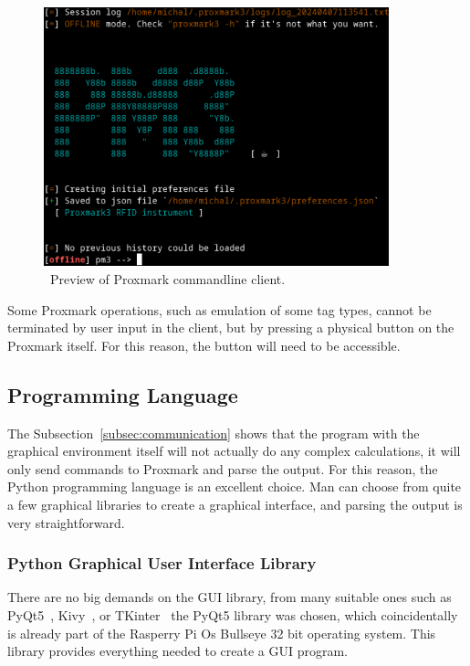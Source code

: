 \begin{figure}[ht]
  \centering
  \includegraphics[width=10cm]{text/pm3.png}
  \caption{~Preview of Proxmark commandline client.}
  \label{fig:pm3}
\end{figure}

Some Proxmark operations, such as emulation of some tag types, cannot be terminated by user input in the client, but by pressing a physical button on the Proxmark itself. For this reason, the button will need to be accessible.


\subsection{Programming Language}

The Subsection~\ref{subsec:communication} shows that the program with the graphical environment itself will not actually do any complex calculations, it will only send commands to Proxmark and parse the output. For this reason, the Python programming language is an excellent choice. Man can choose from quite a few graphical libraries to create a graphical interface, and parsing the output is very straightforward.

\subsubsection{Python Graphical User Interface Library}

There are no big demands on the GUI library, from many suitable ones such as PyQt5~\cite{pythonpyqt5}, Kivy~\cite{pythonkivy}, or TKinter~\cite{pythontkinter} the PyQt5 library was chosen, which coincidentally is already part of the Rasperry Pi Os Bullseye 32 bit operating system. This library provides everything needed to create a GUI program.


